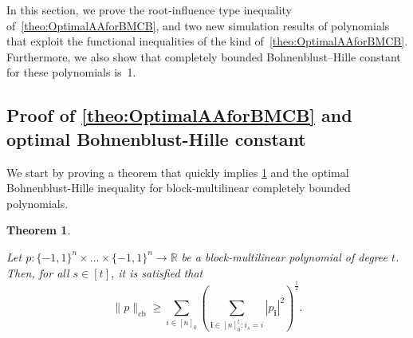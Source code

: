 \documentclass[11pt]{article}
\DeclareMathOperator{\cb}{cb}
\newcommand{\norm}[1]{\|#1\|}
\newcommand{\R}{\mathbb{R}} %
\newcommand{\1}{\mathbf{1}}
\newcommand{\ind}[1]{\mathbf{#1}}
\theoremstyle{plain}
\newtheorem{theorem}{Theorem}[section]
\theoremstyle{definition}
\theoremstyle{remark}
\begin{document}
In this section, we prove the root-influence type inequality of~\cref{theo:OptimalAAforBMCB}, and two new simulation results of polynomials that exploit the functional inequalities of the kind  of~\cref{theo:OptimalAAforBMCB}. Furthermore, we also show that completely bounded  Bohnenblust--Hille constant for these polynomials is~1. 

\subsection{Proof of \cref{theo:OptimalAAforBMCB} and optimal Bohnenblust-Hille constant}
We start by proving a theorem that quickly implies \cref{theo:optimalcbBHBlockMult} and the optimal Bohnenblust-Hille inequality for block-multilinear completely bounded polynomials. 

\begin{theorem}\label{theo:optimalcbBHBlockMult}

Let $p:\{-1,1\}^n\times\dots\times\{-1,1\}^n\to\R$ be a block-multilinear polynomial of degree $t$. Then, for all $s\in [t]$, it is satisfied that  
\begin{equation}
\label{eq:optimalcbBHBlockMult}
    \norm{p}_{\cb}\geq   \sum_{i\in [n]_0} \left(\sum_{\ind  i\in [n]^t_0:i_s=i} |p_{\ind i}|^2\right)^\frac12. 
\end{equation}  
\end{theorem}
\end{document}

